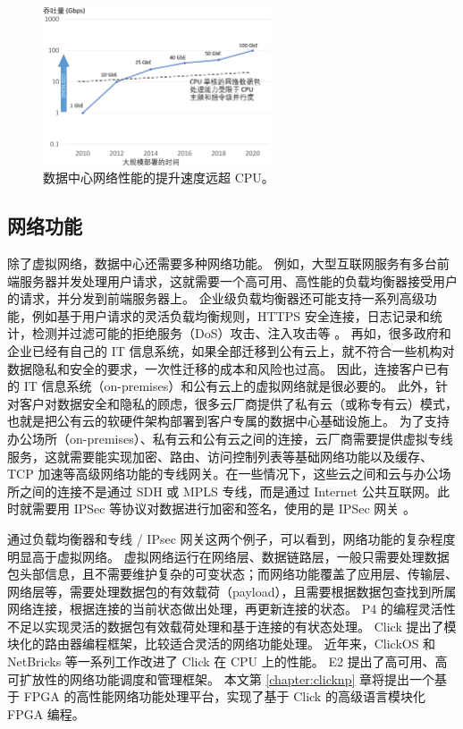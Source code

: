 \begin{figure}[htbp]
	\centering
	\includegraphics[width=0.6\textwidth]{figures/network_perf_trend.pdf}
	\caption{数据中心网络性能的提升速度远超 CPU。}
	\label{background:fig:network-perf-trend}
\end{figure}


\subsection{网络功能}

除了虚拟网络，数据中心还需要多种网络功能。
例如，大型互联网服务有多台前端服务器并发处理用户请求，这就需要一个高可用、高性能的负载均衡器接受用户的请求，并分发到前端服务器上。
企业级负载均衡器还可能支持一系列高级功能，例如基于用户请求的灵活负载均衡规则，HTTPS 安全连接，日志记录和统计，检测并过滤可能的拒绝服务（DoS）攻击、注入攻击等 \cite{ananta}。
再如，很多政府和企业已经有自己的 IT 信息系统，如果全部迁移到公有云上，就不符合一些机构对数据隐私和安全的要求，一次性迁移的成本和风险也过高。
因此，连接客户已有的 IT 信息系统（on-premises）和公有云上的虚拟网络就是很必要的。
此外，针对客户对数据安全和隐私的顾虑，很多云厂商提供了私有云（或称专有云）模式，也就是把公有云的软硬件架构部署到客户专属的数据中心基础设施上。
为了支持办公场所（on-premises）、私有云和公有云之间的连接，云厂商需要提供虚拟专线服务，这就需要能实现加密、路由、访问控制列表等基础网络功能以及缓存、TCP 加速等高级网络功能的专线网关。在一些情况下，这些云之间和云与办公场所之间的连接不是通过 SDH 或 MPLS 专线，而是通过 Internet 公共互联网。此时就需要用 IPSec 等协议对数据进行加密和签名，使用的是 IPSec 网关 \cite{son2017protego}。

通过负载均衡器和专线 / IPsec 网关这两个例子，可以看到，网络功能的复杂程度明显高于虚拟网络。
虚拟网络运行在网络层、数据链路层，一般只需要处理数据包头部信息，且不需要维护复杂的可变状态；而网络功能覆盖了应用层、传输层、网络层等，需要处理数据包的有效载荷（payload），且需要根据数据包查找到所属网络连接，根据连接的当前状态做出处理，再更新连接的状态。
P4 \cite{bosshart2013forwarding} 的编程灵活性不足以实现灵活的数据包有效载荷处理和基于连接的有状态处理。
Click \cite{kohler2000click} 提出了模块化的路由器编程框架，比较适合灵活的网络功能处理。
近年来，ClickOS \cite{martins2014clickos} 和 NetBricks \cite{netbricks} 等一系列工作改进了 Click 在 CPU 上的性能。
E2 \cite{palkar2015e2} 提出了高可用、高可扩放性的网络功能调度和管理框架。
本文第 \ref{chapter:clicknp} 章将提出一个基于 FPGA 的高性能网络功能处理平台，实现了基于 Click 的高级语言模块化 FPGA 编程。





